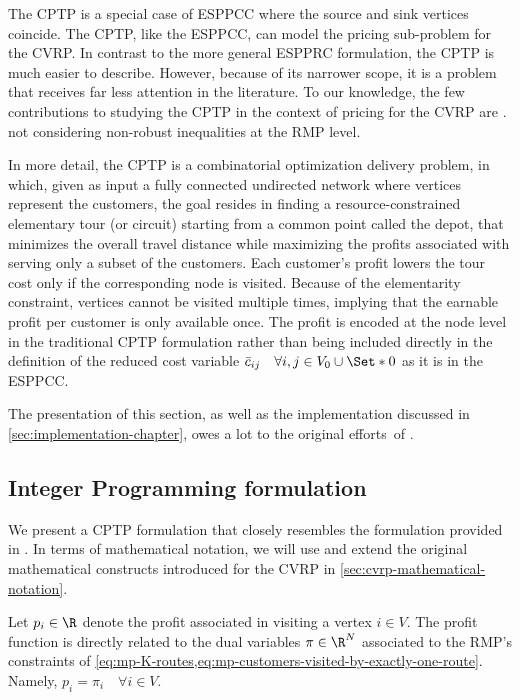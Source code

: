 The CPTP is a special case of ESPPCC where the source and sink vertices coincide.
The CPTP, like the ESPPCC, can model the pricing sub-problem for the CVRP.
In contrast to the more general ESPPRC formulation, the CPTP is much easier to describe.
However, because of its narrower scope, it is a problem that receives far less attention in the literature.
To our knowledge, the few contributions to studying the CPTP in the context of pricing
for the CVRP are \textcite{bixby1999, jepsen2011,jepsen2014}.
not considering non-robust inequalities at the RMP level.

\medskip

In more detail,
the CPTP is a combinatorial optimization delivery problem,
in which,
given as input a fully connected undirected network where vertices represent the customers,
the goal resides in finding a resource-constrained elementary tour (or circuit)
starting from a common point called the depot,
that minimizes the overall travel distance while maximizing
the profits associated with serving only a subset of the customers.
Each customer's profit lowers the tour cost only if the corresponding node is visited.
Because of the elementarity constraint,
vertices cannot be visited multiple times,
implying that the earnable profit per customer is only available once.
The profit is encoded at the node level in the traditional CPTP formulation \parencite{jepsen2014}
rather than being included directly in the definition of the reduced cost variable
$\bar{c}_{ij} \quad \forall i, j \in V_0 \cup \Set*{0}$ as it is in the ESPPCC.

The presentation of this section, as well as the implementation discussed
in \cref{sec:implementation-chapter},
owes a lot to the original efforts of \textcite{jepsen2014}.

\subsection{Integer Programming formulation}
\label{sec:cptp-integer-programming-formulation}

We present a CPTP formulation that closely resembles the formulation provided in \textcite{jepsen2014}.
In terms of mathematical notation, we will use and extend the original
mathematical constructs introduced for the CVRP in \cref{sec:cvrp-mathematical-notation}.

Let $p_i \in \R$ denote the profit associated in visiting a vertex $i \in V$.
The profit function is directly related to the dual variables $\pi \in \R^N$ associated to
the RMP's constraints of \cref{eq:mp-K-routes,eq:mp-customers-visited-by-exactly-one-route}.
Namely, $p_i = \pi_i \quad \forall i \in V$.

